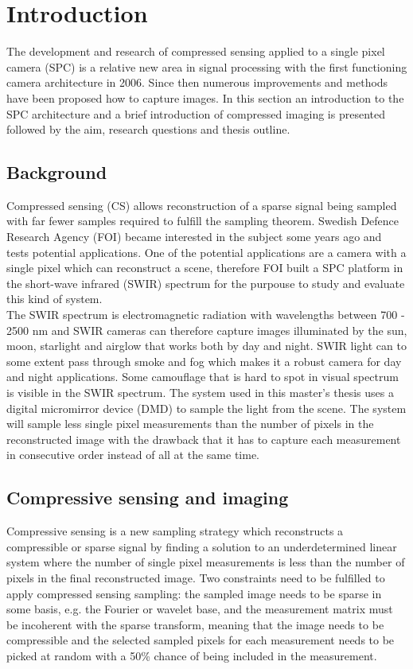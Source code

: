 \section{Introduction}
The development and research of compressed sensing applied to a single pixel camera (SPC) is a relative new area in signal processing with the first functioning camera architecture in 2006. Since then numerous improvements and methods have been proposed how to capture images. In this section an introduction to the SPC architecture and a brief introduction of compressed imaging is presented followed by the aim, research questions and thesis outline. 



\subsection{Background}
Compressed sensing (CS) allows reconstruction of a sparse signal being sampled with far fewer samples required to fulfill the sampling theorem. Swedish Defence Research Agency (FOI) became interested in the subject some years ago and tests potential applications. One of the potential applications are a camera with a single pixel which can reconstruct a scene, therefore FOI built a SPC platform in the short-wave infrared (SWIR) spectrum for the purpouse to study and evaluate this kind of system.\\[0.1in]

The SWIR spectrum is electromagnetic radiation with wavelengths between 700 - 2500 nm and SWIR cameras can therefore capture images illuminated by the sun, moon, starlight and airglow that works both by day and night. SWIR light can to some extent pass through smoke and fog which makes it a robust camera for day and night applications. Some camouflage that is hard to spot in visual spectrum is visible in the SWIR spectrum. The system used in this master’s thesis uses a digital micromirror device (DMD) to sample the light from the scene. The system will sample less single pixel measurements than the number of pixels in the reconstructed image with the drawback that it has to capture each measurement in consecutive order instead of all at the same time.

\subsection{Compressive sensing and imaging}
Compressive sensing is a new sampling strategy which reconstructs a compressible or sparse signal by finding a solution to an underdetermined linear system where the number of single pixel measurements is less than the number of pixels in the final reconstructed image. Two constraints need to be fulfilled to apply compressed sensing sampling: the sampled image needs to be sparse in some basis, e.g. the Fourier or wavelet base, and the measurement matrix must be incoherent with the sparse transform, meaning that the image needs to be compressible and the selected sampled pixels for each measurement needs to be picked at random with a 50\% chance of being included in the measurement.\cite{article:CS_donoho} \\[0.1in]

